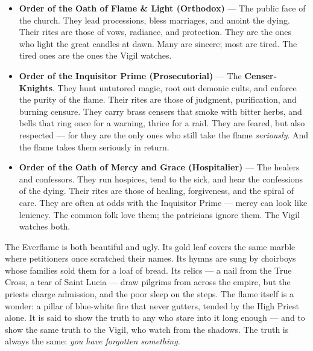 \begin{itemize}
    \item \textbf{Order of the Oath of Flame \& Light (Orthodox)} --- The public face of the church. They lead processions, bless marriages, and anoint the dying. Their rites are those of vows, radiance, and protection. They are the ones who light the great candles at dawn. Many are sincere; most are tired. The tired ones are the ones the Vigil watches.
    \item \textbf{Order of the Inquisitor Prime (Prosecutorial)} --- The \textbf{Censer-Knights}. They hunt untutored magic, root out demonic cults, and enforce the purity of the flame. Their rites are those of judgment, purification, and burning censure. They carry brass censers that smoke with bitter herbs, and bells that ring once for a warning, thrice for a raid. They are feared, but also respected --- for they are the only ones who still take the flame \textit{seriously}. And the flame takes them seriously in return.
    \item \textbf{Order of the Oath of Mercy and Grace (Hospitalier)} --- The healers and confessors. They run hospices, tend to the sick, and hear the confessions of the dying. Their rites are those of healing, forgiveness, and the spiral of care. They are often at odds with the Inquisitor Prime --- mercy can look like leniency. The common folk love them; the patricians ignore them. The Vigil watches both.
\end{itemize}

The Everflame is both beautiful and ugly. Its gold leaf covers the same marble where petitioners once scratched their names. Its hymns are sung by choirboys whose families sold them for a loaf of bread. Its relics --- a nail from the True Cross, a tear of Saint Lucia --- draw pilgrims from across the empire, but the priests charge admission, and the poor sleep on the steps. The flame itself is a wonder: a pillar of blue-white fire that never gutters, tended by the High Priest alone. It is said to show the truth to any who stare into it long enough --- and to show the same truth to the Vigil, who watch from the shadows. The truth is always the same: \textit{you have forgotten something.}

